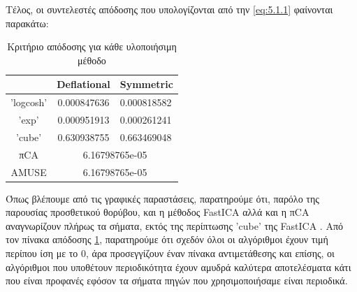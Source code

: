 \noindent Τέλος, οι συντελεστές απόδοσης που υπολογίζονται από την \eqref{eq:5.1.1} φαίνονται παρακάτω: \en
\begin{table}[H] 
\centering
\begin{tabular}{|c|c|l|} 
\hline
          & Deflational  & Symmetric  \\ \hline
'logcosh' & 0.000847636 &  0.000818582 \\ \hline
'exp'     & 0.000951913 &  0.000261241 \\ \hline
'cube'    & 0.630938755 &  0.663469048 \\ \hline
πCA       & \multicolumn{2}{c|}{6.16798765e-05} \\ \hline
AMUSE     & \multicolumn{2}{c|}{6.16798765e-05} \\ \hline
\end{tabular}
\gr
\caption{Κριτήριο απόδοσης για κάθε υλοποιήσιμη μέθοδο}
\label{table:5.1}
\end{table}
\noindent Όπως βλέπουμε από τις γραφικές παραστάσεις, παρατηρούμε ότι, παρόλο της παρουσίας προσθετικού θορύβου, και η μέθοδος \en FastICA \gr αλλά και η π\en CA \gr αναγνωρίζουν πλήρως τα σήματα, εκτός της περίπτωσης \en 'cube' \gr της \en FastICA \gr . Από τον πίνακα απόδοσης \ref{table:5.1}, παρατηρούμε ότι σχεδόν όλοι οι αλγόριθμοι έχουν τιμή περίπου ίση με το 0, άρα προσεγγίζουν έναν πίνακα αντιμετάθεσης και επίσης, οι αλγόριθμοι που υποθέτουν περιοδικότητα έχουν αμυδρά καλύτερα αποτελέσματα κάτι που είναι προφανές εφόσον τα σήματα πηγών που χρησιμοποιήσαμε είναι περιοδικά.
